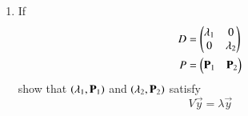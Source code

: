 \documentclass[journal,12pt,twocolumn]{IEEEtran}
\renewcommand\thesection{\arabic{section}}
\begin{document}
\begin{enumerate}[label=\thesection.\arabic*
,ref=\thesection.\theenumi]
\begin{align}
\label{eq:ellipse_parmas_c}
\end{align}
for 
\begin{equation}
\vec{P}^\vec{T}\vec{P} = \vec{I}
\label{eq:ellipse_trans}
\end{equation}
\item If 
\begin{align}
D &= \begin{pmatrix}\lambda_1 & 0 \\ 0 & \lambda_2 \end{pmatrix}
\\
P &= \begin{pmatrix}\mathbf{P}_1 & \mathbf{P}_2 \end{pmatrix}
\end{align}
show that $\left(\lambda_1, \mathbf{P}_1\right)$ and $\left(\lambda_2, \mathbf{P}_2\right)$ satisfy
\begin{equation}
V\vec{y} = \lambda \vec{y}
\label{eq:ellipse_eig}
\end{equation}


\end{enumerate}
\end{document}
